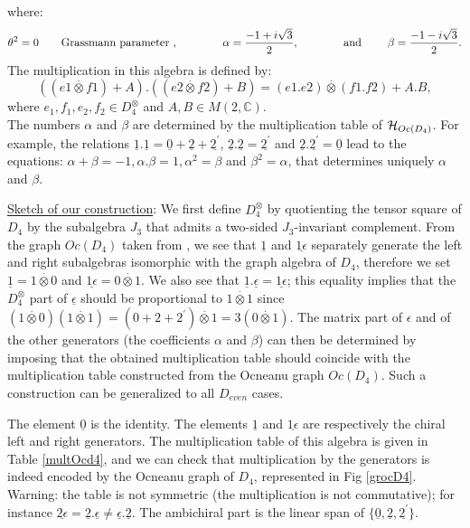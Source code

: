 \documentclass[a4paper,11pt]{article}
\def\text#1{\mbox{\rm #1\ }}
\def \otimesdot {\stackrel{\cdot}{\otimes}}
\newcommand{\ud}[1]{\underline{#1}}
\begin{document}
where:
$$
\theta^2 = 0 \qquad \text{Grassmann parameter}, \qquad \qquad
\alpha   = \frac{-1+i\sqrt{3}}{2}, \qquad\qquad
\text{and} \qquad
\beta    = \frac{-1-i\sqrt{3}}{2}.
$$
The multiplication in this algebra is defined by:
$$
\left( (e1 \otimesdot f1) + A \right) . \left( (e2 \otimesdot f2) + B \right) =
      (e1.e2) \otimesdot (f1.f2)
      + A.B,
$$
where $ e_1, f_1, e_2, f_2 \in D_4^{\otimesdot}$ and $A, B \in M(2,
\mathbb{C})$.\\
The numbers $\alpha$ and $\beta$ are determined by the multiplication table
of ${\cal H}_{Oc(D_4)}$.
For example, the relations $\ud1 . \ud1 = \ud0 + \ud2 + \ud{2^{'}}$, $\ud2 .
\ud2 = \ud{2^{'}}$ and $\ud2 . \ud{2^{'}} = \ud0$ lead to the equations:
$\alpha + \beta = -1, \alpha . \beta = 1, \alpha^2=\beta$ and $\beta^2 =
\alpha$, that determines uniquely $\alpha$ and $\beta$.


\ud{Sketch of our construction}:
We first define $D_4^{\otimesdot}$ by quotienting the tensor square
of $D_{4}$ by the subalgebra $J_{3}$ that admits a two-sided
$J_3$-invariant complement.
   From the graph $Oc(D_{4})$ taken from \cite{Ocneanu:paths}, we see
that $\ud{1}$ and $\ud{1\epsilon}$ separately generate the left and
right subalgebras isomorphic with the graph algebra of $D_{4}$,
therefore we set $\ud{1} = 1 \otimesdot 0$ and $\ud{1\epsilon} = 0
\otimesdot 1$. We also see that $\ud{1} . \ud{\epsilon} =
\ud{1\epsilon}$; this equality implies that the $D_4^{\otimesdot}$ part of
$\ud{\epsilon}$ should be proportional to $1\otimesdot 1$ since
$(1 \otimesdot 0)(1 \otimesdot 1)=(0+2+2^{'})\otimesdot 1 = 3 (0 \otimesdot
1)$. The matrix part of ${\epsilon}$ and of the other generators (the
coefficients $\alpha$ and $\beta$) can then be determined
by imposing that the obtained multiplication table should
coincide with the multiplication table constructed from the Ocneanu
graph $Oc(D_{4})$. Such a construction can be generalized to all
$D_{even}$ cases.


The element $\underline{0}$ is the identity. The elements
$\underline{1}$ and $\underline{1\epsilon}$ are respectively the
chiral left and right generators.
The multiplication table of this algebra is given in Table \ref{multOcd4},
and we can check that multiplication by the generators is indeed
encoded by the Ocneanu graph of $D_4$, represented in Fig \ref{grocD4}.
Warning: the table is not symmetric (the multiplication is not
commutative); for instance $\ud{2\epsilon} = \ud{2}.\ud{\epsilon}
\neq \ud{\epsilon}.\ud{2}$.
The  ambichiral part is the linear span of $\{\ud0, \ud{2}, \ud{2^{'}}  \}$.
\end{document}
